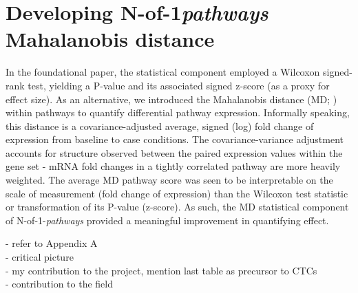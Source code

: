 \chapter{Developing N-of-1\emph{pathways} Mahalanobis distance} \label{Chap:md}

In the foundational paper, the statistical component employed a Wilcoxon signed-rank test, yielding a P-value and its associated signed z-score (as a proxy for effect size). As an alternative, we introduced the Mahalanobis distance (MD; \cite{Schissler2015}) within pathways to quantify differential pathway expression. Informally speaking, this distance is a covariance-adjusted average, signed (log) fold change of expression from baseline to case conditions. The covariance-variance adjustment accounts for structure observed between the paired expression values within the gene set - mRNA fold changes in a tightly correlated pathway are more heavily weighted. The average MD pathway score was seen to be interpretable on the scale of measurement (fold change of expression) than the Wilcoxon test statistic or transformation of its P-value (z-score). As such, the MD statistical component of N-of-1-\emph{pathways} provided a meaningful improvement in quantifying effect. 

- refer to Appendix A \\
- critical picture\\
- my contribution to the project, mention last table as precursor to CTCs\\ 
- contribution to the field\\
